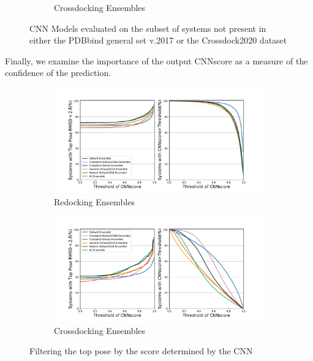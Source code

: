 \documentclass[journal=jcisd8,manuscript=article]{achemso}
\begin{document}
\begin{figure}
\begin{subfigure}[b]{0.48\textwidth}
		\caption{Crossdocking Ensembles}
                \label{fig:No2017NoCD20EnsCD}
        \end{subfigure}
	\caption{CNN Models evaluated on the subset of systems not present in either the PDBbind general set v.2017 or the Crossdock2020 dataset}
	\label{fig:No2017NoCD20}
\end{figure}  

Finally, we examine the importance of the output CNNscore as a measure of the confidence of the prediction. 
\begin{figure}    
        \begin{subfigure}[b]{\textwidth}    
		\centering
		\includegraphics[width=\textwidth]{figures/redocking/thresh_cnnscore_ensembles.pdf}
		\caption{Redocking Ensembles}
		\label{fig:ThreshEnsRD}
        \end{subfigure}    
        \begin{subfigure}[b]{\textwidth}    
		\centering
		\includegraphics[width=\textwidth]{figures/crossdocking/thresh_cnnscore_ensembles.pdf}
		\caption{Crossdocking Ensembles}
                \label{fig:ThreshEnsCD}
        \end{subfigure}
	\caption{Filtering the top pose by the score determined by the CNN}
	\label{fig:ScoreThresh}
\end{figure} 
\end{document}
